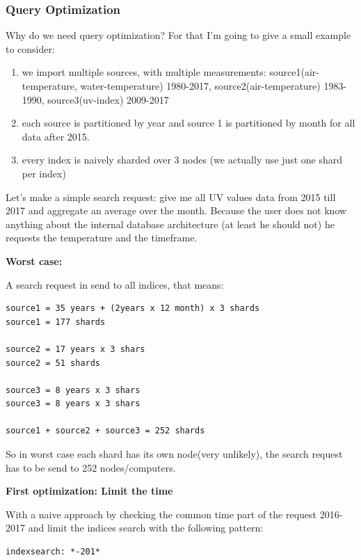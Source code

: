 \subsubsection{Query Optimization}\label{query-optimization}

Why do we need query optimization? For that I'm going to give a small
example to consider:

\begin{enumerate}
\def\labelenumi{\arabic{enumi}.}
\tightlist
\item
  we import multiple sources, with multiple measurements:
  source1(air-temperature, water-temperature) 1980-2017,
  source2(air-temperature) 1983-1990, source3(uv-index) 2009-2017
\item
  each source is partitioned by year and source 1 is partitioned by
  month for all data after 2015.
\item
  every index is naively sharded over 3 nodes (we actually use just one
  shard per index)
\end{enumerate}

Let's make a simple search request: give me all UV values data from 2015
till 2017 and aggregate an average over the month. Because the user does
not know anything about the internal database architecture (at least he
should not) he requests the temperature and the timeframe.

\textbf{Worst case:}

A search request in send to all indices, that means:

\begin{verbatim}
source1 = 35 years + (2years x 12 month) x 3 shards
source1 = 177 shards

source2 = 17 years x 3 shars
source2 = 51 shards

source3 = 8 years x 3 shars
source3 = 8 years x 3 shars

source1 + source2 + source3 = 252 shards
\end{verbatim}

So in worst case each shard has its own node(very unlikely), the search
request has to be send to 252 nodes/computers.

\textbf{First optimization: Limit the time}

With a naive approach by checking the common time part of the request
2016-2017 and limit the indices search with the following pattern:

\begin{verbatim}
indexsearch: *-201*
\end{verbatim}

